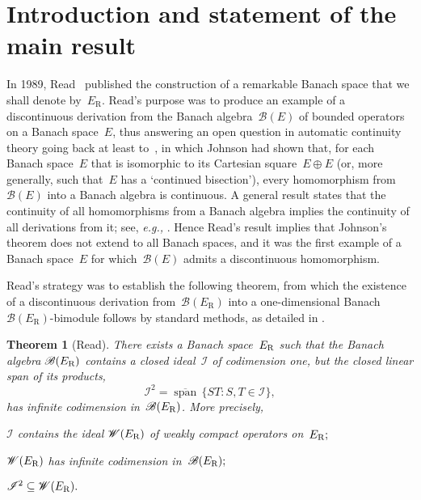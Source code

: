 \documentclass[12pt,reqno]{amsart}
\newtheorem{theorem}{Theorem}[section]
\theoremstyle{definition}
\numberwithin{equation}{section}
\newcounter{smallromans}
\newenvironment{romanenumerate}
{\begin{list}{{\normalfont\textrm{(\roman{smallromans})}}}%
    {\usecounter{smallromans}\setlength{\itemindent}{0cm}%
      \setlength{\leftmargin}{5.5ex}\setlength{\labelwidth}{5.5ex}%
      \setlength{\topsep}{0.2ex}\setlength{\partopsep}{0ex}%
      \setlength{\itemsep}{0.2ex}}}%
  {\end{list}}
\newcommand{\clspa}{\overline{\operatorname{span}}\,}
\begin{document}
\section{Introduction and statement of the main result}%
\label{section1}
\noindent 
In 1989, Read~\cite{read} published the construction of a remarkable
Banach space that we shall denote by~$E_{\text{R}}$. Read's purpose
was to produce an example of a discontinuous derivation from the
Banach algebra~$\mathscr{B}(E)$ of bounded operators on a Banach
space~$E$, thus answering an open question in automatic continuity
theory going back at least to~\cite{johnson}, in which Johnson had
shown that, for each Banach space~$E$ that is isomorphic to its
Cartesian square~\mbox{$E\oplus E$} (or, more generally, such that~$E$
has a `continued bisection'), every homomorphism from~$\mathscr{B}(E)$
into a Banach algebra is continuous. A general result states that the
continuity of all homomorphisms from a Banach algebra implies the
continuity of all derivations from it; see, \emph{e.g.,}
\cite[Theorem~2.7.5(i)]{dales}. Hence Read's result implies that
Johnson's theorem does not extend to all Banach spaces, and it was the
first example of a Banach space~$E$ for which~$\mathscr{B}(E)$ admits
a discontinuous homomorphism.

Read's strategy was to establish the following theorem, from which the
existence of a discontinuous derivation
from~$\mathscr{B}(E_{\text{R}})$ into a one-dimensional Banach
$\mathscr{B}(E_{\text{R}})$-bimodule follows by standard methods, as
detailed in \cite[Theorem~1]{read}.

\begin{theorem}[Read]\label{readMainThm}
There exists a Banach space~$E_{\normalfont{\text{R}}}$ such that the
Banach algebra $\mathscr{B}(E_{\normalfont{\text{R}}})$ contains a
closed ideal~$\mathscr{I}$ of codimension one, but
the closed linear span of its products,
\[ \mathscr{I}^2 = \clspa\{ ST : S,T\in\mathscr{I}\}, \]
has infinite codimension in~$\mathscr{B}(E_{\normalfont{\text{R}}})$. 
More precisely, 
\begin{romanenumerate}
\item\label{readMainThm1} $\mathscr{I}$ contains the ideal
  $\mathscr{W}(E_{\normalfont{\text{R}}})$ of weakly compact operators
  on~$E_{\normalfont{\text{R}}};$
\item\label{readMainThm2} $\mathscr{W}(E_{\normalfont{\text{R}}})$ has
  infinite codimension in~$\mathscr{B}(E_{\normalfont{\text{R}}});$
\item\label{readMainThm3}
  $\mathscr{I}^2\subseteq\mathscr{W}(E_{\normalfont{\text{R}}}).$
\end{romanenumerate}
\end{theorem}
\end{document}
